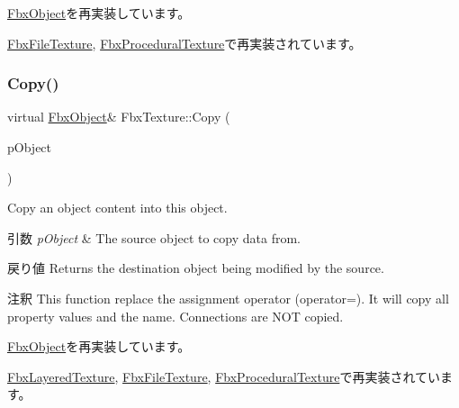 \hyperlink{class_fbx_object_ad44f814323dc1b5e78bff1bfc608b4bb}{Fbx\+Object}を再実装しています。



\hyperlink{class_fbx_file_texture_a698164ee49ac5fb2a5d5e3e7a2cb9e9f}{Fbx\+File\+Texture}, \hyperlink{class_fbx_procedural_texture_ae718dfc2092f735a1b6bcd724029a36c}{Fbx\+Procedural\+Texture}で再実装されています。

\mbox{\label{class_fbx_texture_a321c23c2dc2e91c58e2fcc2ed7d29f9e}} 
\subsubsection{\texorpdfstring{Copy()}{Copy()}}
{\footnotesize\ttfamily virtual \hyperlink{class_fbx_object}{Fbx\+Object}\& Fbx\+Texture\+::\+Copy (\begin{DoxyParamCaption}\item[{const \hyperlink{class_fbx_object}{Fbx\+Object} \&}]{p\+Object }\end{DoxyParamCaption})\hspace{0.3cm}{\ttfamily [virtual]}}

Copy an object content into this object. 
\begin{DoxyParams}{引数}
{\em p\+Object} & The source object to copy data from. \\
\hline
\end{DoxyParams}
\begin{DoxyReturn}{戻り値}
Returns the destination object being modified by the source. 
\end{DoxyReturn}
\begin{DoxyRemark}{注釈}
This function replace the assignment operator (operator=). It will copy all property values and the name. Connections are N\+OT copied. 
\end{DoxyRemark}


\hyperlink{class_fbx_object_a0c0c5adb38284d14bb82c04d54504a3e}{Fbx\+Object}を再実装しています。



\hyperlink{class_fbx_layered_texture_a61ca1d210dcae83133ad2ee1c9c7daa9}{Fbx\+Layered\+Texture}, \hyperlink{class_fbx_file_texture_a4ef7372132caebc8d1e5992efb894c9d}{Fbx\+File\+Texture}, \hyperlink{class_fbx_procedural_texture_aab5e11d2e578c958cbe97f999379eeb4}{Fbx\+Procedural\+Texture}で再実装されています。


